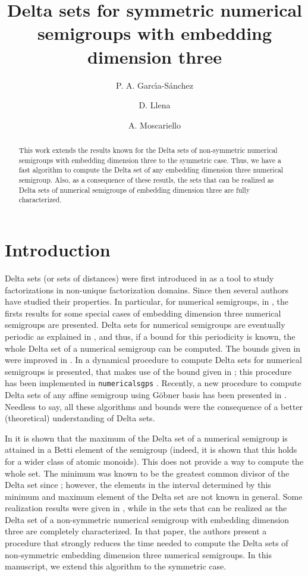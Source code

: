 \documentclass[11pt]{amsart}
\title{Delta sets for symmetric numerical semigroups with embedding dimension three}
\author{P. A. Garc\'{\i}a-S\'{a}nchez}
\author{D. Llena}
\author{A. Moscariello}
\theoremstyle{remark}
\begin{document}
\maketitle
\begin{abstract}
	This work extends the results known for the Delta sets of non-symmetric numerical semigroups with embedding dimension three to the symmetric case. Thus, we have a fast algorithm to compute the Delta set of any embedding dimension three numerical semigroup. Also, as a consequence of these resutls, the sets that can be realized as Delta sets of numerical semigroups of embedding dimension three are fully characterized.
\end{abstract}
\section{Introduction}
Delta sets (or sets of distances) were first introduced in \cite{G} as a tool to study factorizations in non-unique factorization domains. Since then several authors have studied their properties. In particular, for numerical semigroups, in \cite{BCKR}, the firsts results for some special cases of embedding dimension three numerical semigroups are presented. Delta sets for numerical semigroups are eventually periodic as explained in \cite{CHK}, and thus, if a bound for this periodicity is known, the whole Delta set of a numerical semigroup can be computed. The bounds given in \cite{CHK} were improved in \cite{GMV}. In \cite{MOP} a dynamical procedure to compute Delta sets for numerical semigroups is presented, that makes use of the bound given in \cite{GMV}; this procedure has been implemented in \texttt{numericalsgps} \cite{numericalsgps}. Recently, a new procedure to compute Delta sets of any affine semigroup using G\"obner basis has been presented in \cite{G-SOW}. Needless to say, all these algorithms and bounds were the consequence of a better (theoretical) understanding of Delta sets. 

In \cite{CGLMS} it is shown that the maximum of the Delta set of a numerical semigroup is attained in a Betti element of the semigroup (indeed, it is shown that this holds for a wider class of atomic monoids). This does not provide a way to compute the whole set. The minimum was known to be the greatest common divisor of the Delta set since \cite{G}; however, the elements in the interval determined by this minimum and maximum element of the Delta set are not known in general. Some realization results were given in \cite{k-deltas}, while in \cite{G-SLM} the sets that can be realized as the Delta set of a non-symmetric numerical semigroup with embedding dimension three are completely characterized. In that paper, the authors present a procedure that strongly reduces the time needed to compute the Delta sets of non-symmetric embedding dimension three numerical semigroups. In this manuscript, we extend this algorithm to the symmetric case. 
\end{document}
